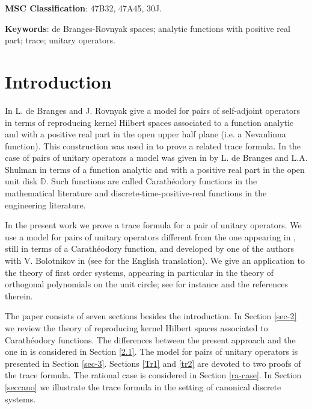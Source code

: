\documentclass[12pt]{amsart}
\theoremstyle{definition}
\theoremstyle{remark}
\numberwithin{equation}{section}
\begin{document}
{\bf MSC Classification}: 47B32, 47A45,  30J.

{\bf Keywords}: de Branges-Rovnyak spaces; analytic functions with positive real part; trace; unitary operators.

\section{Introduction}
\setcounter{equation}{0}
In \cite{dbr1} L. de Branges and J. Rovnyak give a model for pairs of self-adjoint operators in terms of reproducing kernel Hilbert spaces associated to a function analytic and
with a positive real part in the open upper half plane  (i.e. a Nevanlinna function). This construction was used in \cite{MR1960423,MR2069002} to prove a related trace formula.
In the case of pairs of unitary operators a model was given in \cite{dbs} by L. de Branges and L.A. Shulman in terms of a function analytic and with a positive real part in the open
unit disk $\mathbb D$. Such functions are called  Carath\'eodory functions in the mathematical literature and discrete-time-positive-real functions
in the engineering literature.\smallskip

In the present work we prove a trace formula for a pair of unitary operators. We use a model for pairs of unitary operators different from the one appearing in \cite{dbs},
still in terms of a Carath\'eodory function, and developed by one of the authors with V. Bolotnikov in \cite[\S 5.3 p. 104]{MR1638044}
(see \cite[\S 5.3 p. 87]{MR2002b:47144} for the English translation). We give an application to the theory of first order systems, appearing in
particular in the theory of orthogonal polynomials on the unit circle; see for instance \cite{DI1, szego} and the references therein.\smallskip

The paper consists of seven sections besides the introduction. In Section \ref{sec-2} we review the theory of reproducing kernel Hilbert spaces
associated to Carath\'eodory functions. The differences between the present approach and the one in \cite{dbs} is considered in Section \ref{2.1}.
The model for pairs of unitary operators is presented in Section \ref{sec-3}. Sections \ref{Tr1} and \ref{tr2} are devoted to two proofs
of the trace formula. The rational case is considered in Section \ref{ra-case}. In Section \ref{seccano} we illustrate the trace formula in the setting of canonical  discrete
systems.
\end{document}
